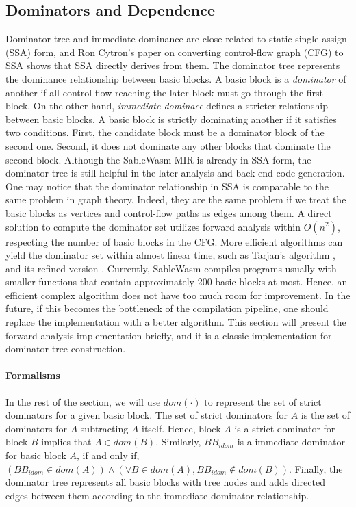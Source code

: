 \subsection{Dominators and Dependence}

Dominator tree and immediate dominance are close related to static-single-assign (SSA) form, and Ron Cytron's paper on converting control-flow graph (CFG) to SSA \cite{cytron-ssa} shows that SSA directly derives from them. The dominator tree represents the dominance relationship between basic blocks. A basic block is a \emph{dominator} of another if all control flow reaching the later block must go through the first block. On the other hand, \emph{immediate dominace} defines a stricter relationship between basic blocks. A basic block is strictly dominating another if it satisfies two conditions. First, the candidate block must be a dominator block of the second one. Second, it does not dominate any other blocks that dominate the second block. Although the SableWasm MIR is already in SSA form, the dominator tree is still helpful in the later analysis and back-end code generation. One may notice that the dominator relationship in SSA is comparable to the same problem in graph theory. Indeed, they are the same problem if we treat the basic blocks as vertices and control-flow paths as edges among them.  A direct solution to compute the dominator set utilizes forward analysis within $O(n^2)$, respecting the number of basic blocks in the CFG. More efficient algorithms can yield the dominator set within almost linear time, such as Tarjan's algorithm \cite{tarjan-fast-dominator}, and its refined version \cite{tarjan-fast-dominator-improved}. Currently, SableWasm compiles programs usually with smaller functions that contain approximately 200 basic blocks at most. Hence, an efficient complex algorithm does not have too much room for improvement. In the future, if this becomes the bottleneck of the compilation pipeline, one should replace the implementation with a better algorithm. This section will present the forward analysis implementation briefly, and it is a classic implementation for dominator tree construction.

\paragraph{Formalisms}
In the rest of the section, we will use $dom(\cdot)$ to represent the set of strict dominators for a given basic block. The set of strict dominators for $A$ is the set of dominators for $A$ subtracting $A$ itself. Hence, block $A$ is a strict dominator for block $B$ implies that $A \in dom(B)$. Similarly, $BB_{idom}$ is a immediate dominator for basic block $A$, if and only if, $(BB_{idom} \in dom(A)) \land (\forall B \in dom(A), BB_{idom} \notin dom(B))$. Finally, the dominator tree represents all basic blocks with tree nodes and adds directed edges between them according to the immediate dominator relationship.

